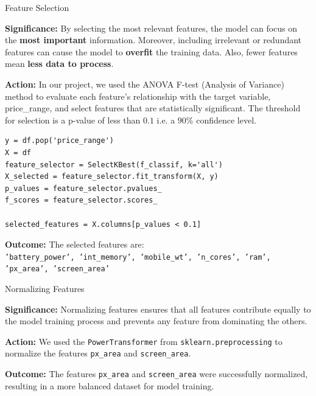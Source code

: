 \documentclass[14pt, aspectratio=169]{beamer}
\begin{document}
\begin{frame}{Feature Selection}
  \begin{block}{}
    \textbf{Significance:} \small
    By selecting the most relevant features, the model can focus on the \textbf{most important} information. Moreover, including irrelevant or redundant features can cause the model to \textbf{overfit} the training data. Also, fewer features mean \textbf{less data to process}.
  \end{block}
  \begin{block}{}
    \textbf{Action:} \small
    In our project, we used the ANOVA F-test (Analysis of Variance) method to evaluate each feature's relationship with the target variable, price\_range, and select features that are statistically significant. The threshold for selection is a p-value of less than $0.1$ i.e. a $90\%$ confidence level.
  \end{block}
\footnotesize
  \begin{verbatim}
y = df.pop('price_range')
X = df
feature_selector = SelectKBest(f_classif, k='all')  
X_selected = feature_selector.fit_transform(X, y)
p_values = feature_selector.pvalues_
f_scores = feature_selector.scores_

selected_features = X.columns[p_values < 0.1]
  \end{verbatim}
  \normalsize
  \begin{block}{}
    \textbf{Outcome:} \small
    The selected features are: \\
    \texttt{'battery\_power', 'int\_memory', 'mobile\_wt', 'n\_cores', 'ram', 'px\_area', 'screen\_area'}
  \end{block}
\end{frame}
\begin{frame}[allowframebreaks]{Normalizing Features}
  \begin{block}{}
    \textbf{Significance:} \small
    Normalizing features ensures that all features contribute equally to the model training process and prevents any feature from dominating the others.
  \end{block}
  \begin{block}{}
    \textbf{Action:} \small
    We used the \texttt{PowerTransformer} from \texttt{sklearn.preprocessing} to normalize the features \texttt{px\_area} and \texttt{screen\_area}.
  \end{block}
  \begin{block}{}
    \textbf{Outcome:} \small
    The features \texttt{px\_area} and \texttt{screen\_area} were successfully normalized, resulting in a more balanced dataset for model training.
  \end{block}
\end{frame}
\end{document}
